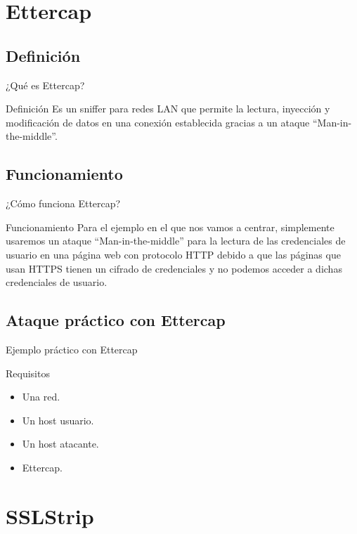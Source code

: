 \documentclass{beamer}
\begin{document}
\section{Ettercap}
\subsection{Definición}
\begin{frame}{¿Qué es Ettercap?}
	\begin{block}{Definición}
		Es un sniffer para redes LAN que permite la lectura, inyección y modificación de datos en una conexión establecida gracias a un ataque ``Man-in-the-middle''.
	\end{block}
\end{frame}

\subsection{Funcionamiento}
\begin{frame}{¿Cómo funciona Ettercap?}
	\begin{block}{Funcionamiento}
		Para el ejemplo en el que nos vamos a centrar, simplemente usaremos un ataque ``Man-in-the-middle'' para la lectura de las credenciales de usuario en una página web con protocolo HTTP debido a que las páginas que usan HTTPS tienen un cifrado de credenciales y no podemos acceder a dichas credenciales de usuario.
	\end{block}
\end{frame}

\subsection{Ataque práctico con Ettercap}
\begin{frame}{Ejemplo práctico con Ettercap}
	\begin{block}{Requisitos}
		\begin{itemize}
			\item Una red.
			\item Un host usuario.
			\item Un host atacante.
			\item Ettercap.
		\end{itemize}
	\end{block}	
\end{frame}

\section{SSLStrip}
\end{document}
